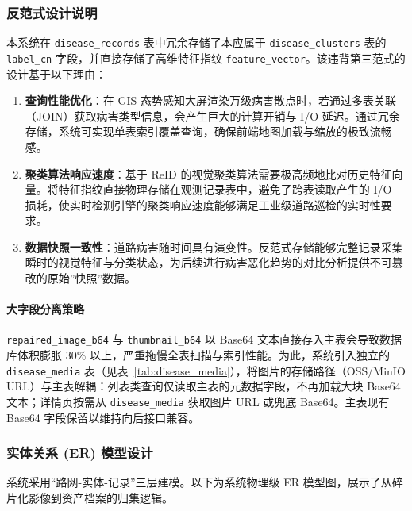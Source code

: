 \documentclass[UTF8, a4paper, fontset=ubuntu]{ctexart}
\begin{document}
\subsubsection{反范式设计说明}
本系统在 \texttt{disease\_records} 表中冗余存储了本应属于 \texttt{disease\_clusters} 表的 \texttt{label\_cn} 字段，并直接存储了高维特征指纹 \texttt{feature\_vector}。该违背第三范式的设计基于以下理由：

\begin{enumerate}[label=\arabic*.]
    \item \textbf{查询性能优化}：在 GIS 态势感知大屏渲染万级病害散点时，若通过多表关联（JOIN）获取病害类型信息，会产生巨大的计算开销与 I/O 延迟。通过冗余存储，系统可实现单表索引覆盖查询，确保前端地图加载与缩放的极致流畅感。
    \item \textbf{聚类算法响应速度}：基于 ReID 的视觉聚类算法需要极高频地比对历史特征向量。将特征指纹直接物理存储在观测记录表中，避免了跨表读取产生的 I/O 损耗，使实时检测引擎的聚类响应速度能够满足工业级道路巡检的实时性要求。
    \item \textbf{数据快照一致性}：道路病害随时间具有演变性。反范式存储能够完整记录采集瞬时的视觉特征与分类状态，为后续进行病害恶化趋势的对比分析提供不可篡改的原始”快照”数据。
\end{enumerate}

\paragraph{大字段分离策略}
\texttt{repaired\_image\_b64} 与 \texttt{thumbnail\_b64} 以 Base64 文本直接存入主表会导致数据库体积膨胀 30\% 以上，严重拖慢全表扫描与索引性能。为此，系统引入独立的 \texttt{disease\_media} 表（见表~\ref{tab:disease_media}），将图片的存储路径（OSS/MinIO URL）与主表解耦：列表类查询仅读取主表的元数据字段，不再加载大块 Base64 文本；详情页按需从 \texttt{disease\_media} 获取图片 URL 或兜底 Base64。主表现有 Base64 字段保留以维持向后接口兼容。

\subsubsection{实体关系 (ER) 模型设计}
系统采用“路网-实体-记录”三层建模。以下为系统物理级 ER 模型图，展示了从碎片化影像到资产档案的归集逻辑。
\end{document}
